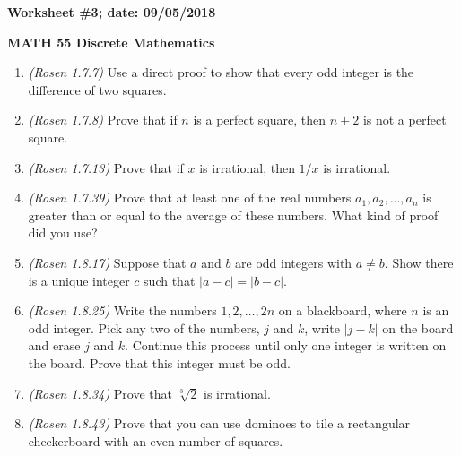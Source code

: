 \documentclass{article}
\begin{document}
{\bf Worksheet \#3; date: 09/05/2018}

{\bf MATH 55 Discrete Mathematics}

\begin{enumerate}
\item {\em (Rosen 1.7.7)} Use a direct proof to show that every odd integer is the difference of two squares.

\item {\em (Rosen 1.7.8)} Prove that if $n$ is a perfect square, then $n+2$ is not a perfect square.

\item {\em (Rosen 1.7.13)} Prove that if $x$ is irrational, then $1/x$ is irrational.

\item {\em (Rosen 1.7.39)} Prove that at least one of the real numbers $a_1, a_2, \ldots, a_n$ is greater than or equal to the average of these numbers. What kind of proof did you use?

\item {\em (Rosen 1.8.17)} Suppose that $a$ and $b$ are odd integers with $a \ne b$. Show there is a unique integer $c$ such that $|a - c| = |b - c|$.

\item {\em (Rosen 1.8.25)} Write the numbers $1, 2, \ldots, 2n$ on a blackboard, where $n$ is an odd integer. Pick any two of the numbers, $j$ and $k$, write $|j-k|$ on the board and erase $j$ and $k$. Continue this process until only one integer is written on the board. Prove that this integer must be odd.

\item {\em (Rosen 1.8.34)} Prove that $\sqrt[3]{2}$ is irrational.

\item {\em (Rosen 1.8.43)} Prove that you can use dominoes to tile a rectangular checkerboard with an even number of squares.
\end{enumerate}
\end{document}

